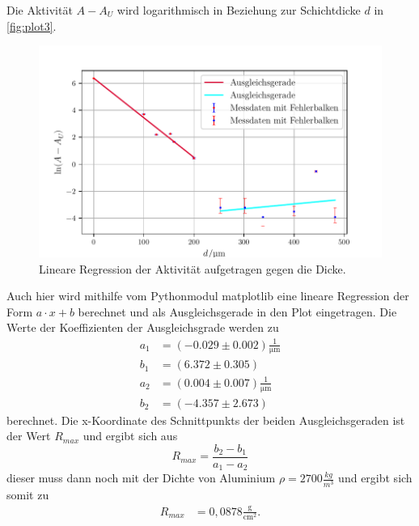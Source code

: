  Die Aktivität $A-A_U$ wird logarithmisch in Beziehung zur Schichtdicke $d$ in \autoref{fig:plot3}.
\begin{figure}[H]
  \centering
  \includegraphics{build/plot3.pdf}
  \caption {Lineare Regression der Aktivität aufgetragen gegen die Dicke.}
  \label{fig:plot3}
\end{figure}

Auch hier wird mithilfe vom Pythonmodul matplotlib \cite{matplotlib} eine lineare Regression der Form $a \cdot x + b$ berechnet und 
als Ausgleichsgerade in den Plot eingetragen. 
Die Werte der Koeffizienten der Ausgleichsgrade werden zu
\begin{align*}
  a_1 &= (-0.029 \pm 0.002) \frac{1}{\si{\micro\meter}}\\
  b_1 &= (6.372 \pm 0.305) \\
  a_2 &= (0.004 \pm 0.007) \frac{1}{\si{\micro\meter}}\\
  b_2 &= (-4.357 \pm 2.673)
\end{align*}
berechnet.
Die x-Koordinate des Schnittpunkts der beiden Ausgleichsgeraden ist der Wert $R_{max}$ und ergibt
sich aus
\begin{equation}
  R_{max} =  \frac{b_2 - b_1}{a_1 - a_2}
  \label{eqn:Rmax}
\end{equation}
dieser muss dann noch mit der Dichte von Aluminium $\rho = 2700 \frac{kg}{m^3}$\cite{AlDichte} und ergibt sich somit zu
\begin{align}
  R_{max} &= 0,0878 \frac{\si{\g}}{\si{\centi\meter^2}}.
\end{align}


